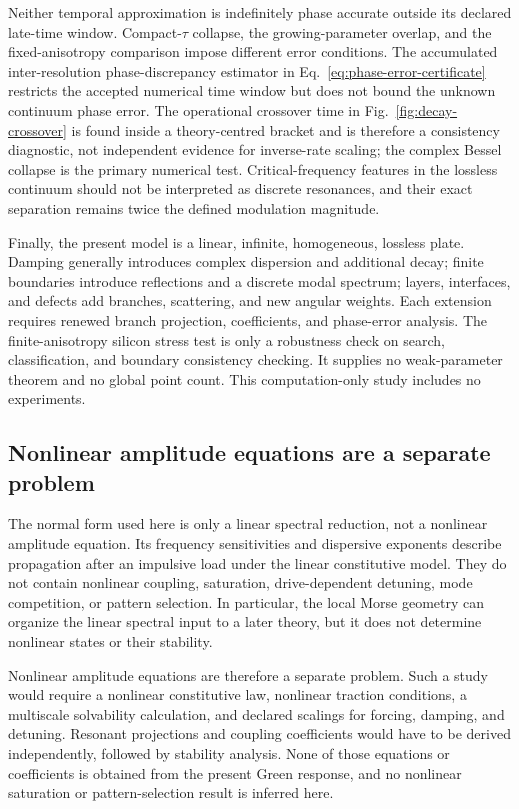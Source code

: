 Neither temporal approximation is indefinitely phase accurate outside its
declared late-time window.  Compact-\(\tau\) collapse, the growing-parameter
overlap, and the fixed-anisotropy comparison impose different error
conditions.  The accumulated inter-resolution phase-discrepancy estimator in
Eq.~\eqref{eq:phase-error-certificate} restricts the accepted numerical time
window but does not bound the unknown continuum phase error.  The operational
crossover time in Fig.~\ref{fig:decay-crossover} is found inside a
theory-centred bracket and is therefore a consistency diagnostic, not
independent evidence for inverse-rate scaling; the complex Bessel collapse is
the primary numerical test.  Critical-frequency features in
the lossless continuum should not be interpreted as discrete resonances, and
their exact separation remains twice the defined modulation magnitude.

Finally, the present model is a linear, infinite, homogeneous, lossless plate.
Damping generally introduces complex dispersion and additional decay; finite
boundaries introduce reflections and a discrete modal spectrum; layers,
interfaces, and defects add branches, scattering, and new angular weights.
Each extension requires renewed branch
projection, coefficients, and phase-error analysis.  The finite-anisotropy
silicon stress test is only a robustness check on search, classification, and
boundary consistency checking.  It supplies no weak-parameter theorem and no
global point count.  This computation-only study includes no experiments.

\subsection{Nonlinear amplitude equations are a separate problem}

The normal form used here is only a linear spectral reduction, not a nonlinear
amplitude equation.  Its frequency sensitivities and dispersive exponents
describe propagation after an impulsive load under the linear constitutive
model.  They do not contain nonlinear coupling, saturation, drive-dependent
detuning, mode competition, or pattern selection.  In particular, the local
Morse geometry can organize the linear spectral input to a later theory, but
it does not determine nonlinear states or their stability.

Nonlinear amplitude equations are therefore a separate problem.  Such a study
would require a nonlinear constitutive law, nonlinear traction conditions, a
multiscale solvability calculation, and declared scalings for forcing,
damping, and detuning.  Resonant projections and coupling coefficients would
have to be derived independently, followed by stability analysis.  None of
those equations or coefficients is obtained from the present Green response,
and no nonlinear saturation or pattern-selection result is inferred here.
